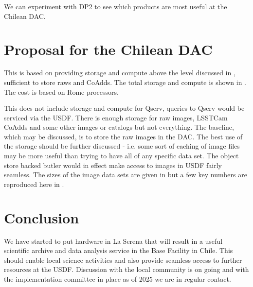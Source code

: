 We can experiment with DP2 to see which products are most useful at the Chilean DAC.



\section{Proposal for the Chilean DAC}\label{sec:prop}


This is based on providing storage and compute above the level discussed in , sufficient to store raws and CoAdds.
The total storage and compute is shown in . The cost is based on Rome processors.



This does not include storage and compute for Qserv, queries to Qserv would be serviced via the USDF.
There is enough storage for raw images, LSSTCam CoAdds and some other images or catalogs but not everything.
The baseline, which may be discussed, is to store the raw images in the DAC.
The best use of the storage should be further discussed - i.e. some sort of caching of image files may be more useful than trying to have all of any specific data set.
The object store backed butler would in effect make access to images in USDF fairly seamless.
The sizes of the image data sets are given in  but a few key numbers are reproduced here in .





\section{Conclusion}

We have started to put hardware in La Serena that will result in a useful scientific archive and data analysis service in the Base Facility in Chile.
This should enable local science activities and also provide seamless access to further resources at the USDF.
Discussion with the local community is on going and with the implementation committee in place as of 2025 we are in regular contact.
